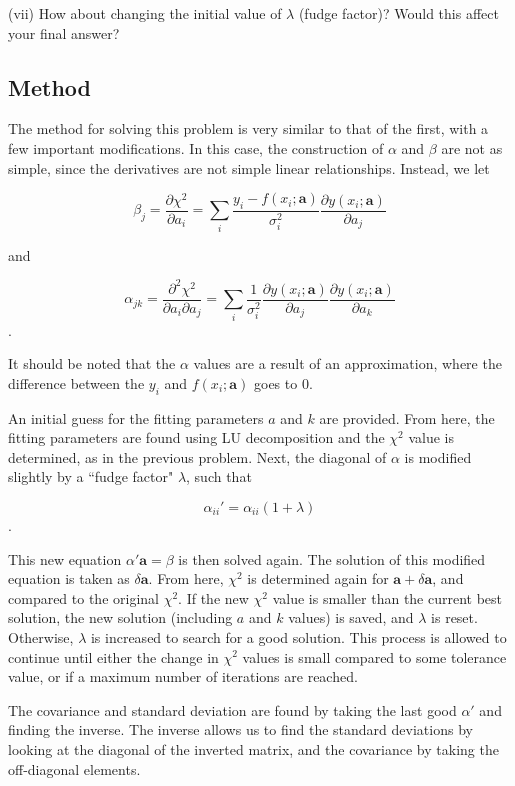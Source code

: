 \documentclass[10pt,letter]{article}
\begin{document}
(vii) How about changing the initial value of $\lambda$ (fudge factor)? Would this affect
your final answer?

\subsection{Method}

The method for solving this problem is very similar to that of the first, with a few important modifications. In this case, the construction of $\alpha$ and $\beta$ are not as simple, since the derivatives are not simple linear relationships. Instead, we let

$$\beta_{j} = \frac{\partial\chi^2}{\partial a_{i}} = \sum_i \frac{y_i - f(x_i;\textbf{a})}{\sigma_i^2} \frac{\partial y(x_i;\textbf{a})}{\partial a_j}$$

and

$$ \alpha_{jk} = \frac{\partial^2\chi^2}{\partial a_{i} \partial a_j} = \sum_i \frac{1}{\sigma_i^2} \frac{\partial y(x_i;\textbf{a})}{\partial a_j}\frac{\partial y(x_i;\textbf{a})}{\partial a_k} $$.

It should be noted that the $\alpha$ values are a result of an approximation, where the difference between the $y_i$ and $f(x_i;\textbf{a})$ goes to 0.

An initial guess for the fitting parameters $a$ and $k$ are provided. From here, the fitting parameters are found using LU decomposition and the $\chi^2$ value is determined, as in the previous problem. Next, the diagonal of $\alpha$ is modified slightly by a ``fudge factor" $\lambda$, such that

$$\alpha_{ii} ' = \alpha_{ii}(1+\lambda) $$.

This new equation $\alpha ' \textbf{a} = \beta$ is then solved again. The solution of this modified equation is taken as $\delta \textbf{a}$. From here, $\chi^2$ is determined again for $\textbf{a}+\delta \textbf{a}$, and compared to the original $\chi^2$. If the new $\chi^2$ value is smaller than the current best solution, the new solution (including $a$ and $k$ values) is saved, and $\lambda$ is reset. Otherwise, $\lambda$ is increased to search for a good solution. This process is allowed to continue until either the change in $\chi^2$ values is small compared to some tolerance value, or if a maximum number of iterations are reached.

The covariance and standard deviation are found by taking the last good $\alpha '$ and finding the inverse. The inverse allows us to find the standard deviations by looking at the diagonal of the inverted matrix, and the covariance by taking the off-diagonal elements.
\end{document}
